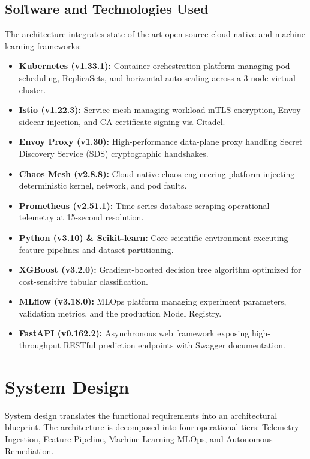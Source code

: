 \documentclass[12pt,a4paper]{report}
\begin{document}
\section{Software and Technologies Used}
The architecture integrates state-of-the-art open-source cloud-native and machine learning frameworks:
\begin{itemize}
    \item \textbf{Kubernetes (v1.33.1):} Container orchestration platform managing pod scheduling, ReplicaSets, and horizontal auto-scaling across a 3-node virtual cluster.
    \item \textbf{Istio (v1.22.3):} Service mesh managing workload mTLS encryption, Envoy sidecar injection, and CA certificate signing via Citadel.
    \item \textbf{Envoy Proxy (v1.30):} High-performance data-plane proxy handling Secret Discovery Service (SDS) cryptographic handshakes.
    \item \textbf{Chaos Mesh (v2.8.8):} Cloud-native chaos engineering platform injecting deterministic kernel, network, and pod faults.
    \item \textbf{Prometheus (v2.51.1):} Time-series database scraping operational telemetry at 15-second resolution.
    \item \textbf{Python (v3.10) \& Scikit-learn:} Core scientific environment executing feature pipelines and dataset partitioning.
    \item \textbf{XGBoost (v3.2.0):} Gradient-boosted decision tree algorithm optimized for cost-sensitive tabular classification.
    \item \textbf{MLflow (v3.18.0):} MLOps platform managing experiment parameters, validation metrics, and the production Model Registry.
    \item \textbf{FastAPI (v0.162.2):} Asynchronous web framework exposing high-throughput RESTful prediction endpoints with Swagger documentation.
\end{itemize}

\chapter{System Design}

System design translates the functional requirements into an architectural blueprint. The architecture is decomposed into four operational tiers: Telemetry Ingestion, Feature Pipeline, Machine Learning MLOps, and Autonomous Remediation.
\end{document}
